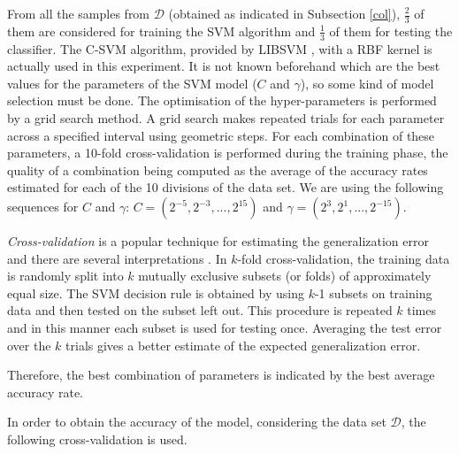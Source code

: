 From all the samples from $\mathcal{D}$ (obtained as indicated in Subsection \ref{col}), $\frac{2}{3}$ of them are considered for training the SVM
algorithm and $\frac{1}{3}$ of them for testing the classifier.
The C-SVM algorithm, provided by LIBSVM \cite{libsvm}, with a RBF kernel is
actually used in this experiment. It is not known beforehand which are the best values for the parameters of the SVM model ($C$ and $\gamma$), so some kind of model selection must be done. The optimisation of the hyper-parameters
is performed by a grid search method. A grid search makes repeated trials for each parameter across a specified interval using geometric steps.  For each combination of these
parameters, a 10-fold cross-validation is performed during the training phase,
the quality of a combination being computed as the average of the accuracy
rates estimated for each of the 10 divisions of the data set. 
We are using the following sequences for $C$ and $\gamma$:  $C=(2^{-5}, 2^{-3},..., 2^{15})$ and $\gamma=(2^{3},2^{1},...,2^{-15})$.

\emph{Cross-validation} is a popular technique for estimating the generalization error and there
are several interpretations \cite{wahba}. In $k$-fold cross-validation, the training data is randomly split
into $k$ mutually exclusive subsets (or folds) of approximately equal size. The SVM decision
rule is obtained by using $k$-1 subsets on training data and then tested on the subset left
out. This procedure is repeated $k$ times and in this manner each subset is used for testing
once. Averaging the test error over the $k$ trials gives a better estimate of the expected
generalization error.

Therefore, the best combination of parameters is indicated by the best average accuracy rate.

In order to obtain the accuracy of the model, considering the data set $\mathcal{D}$, the following cross-validation is used.

